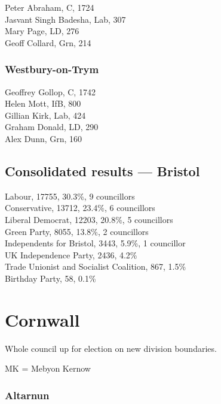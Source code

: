 \documentclass[a4paper,openany,10pt]{book}
\begin{document}


Peter Abraham, C, 1724\\
Jasvant Singh Badesha, Lab, 307\\
Mary Page, LD, 276\\
Geoff Collard, Grn, 214\\


\subsubsection*{Westbury-on-Trym}



Geoffrey Gollop, C, 1742\\
Helen Mott, IfB, 800\\
Gillian Kirk, Lab, 424\\
Graham Donald, LD, 290\\
Alex Dunn, Grn, 160\\




\subsection*{Consolidated results --- Bristol}
Labour, 17755, 30.3\%, 9 councillors\\
Conservative, 13712, 23.4\%, 6 councillors\\
Liberal Democrat, 12203, 20.8\%, 5 councillors\\
Green Party, 8055, 13.8\%, 2 councillors\\
Independents for Bristol, 3443, 5.9\%, 1 councillor\\
UK Independence Party, 2436, 4.2\% \\
Trade Unionist and Socialist Coalition, 867, 1.5\% \\
Birthday Party, 58, 0.1\% \\


\vfill

\section{Cornwall}

Whole council up for election on new division boundaries.

MK = Mebyon Kernow



\subsubsection*{Altarnun}
\end{document}
